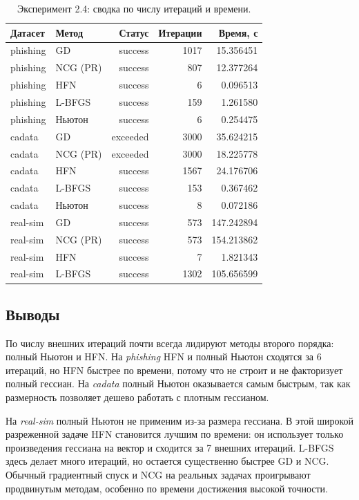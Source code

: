 \documentclass[a4paper,12pt]{article}
\begin{document}
\begin{table}[H]
\centering
\small
\begin{tabular}{@{}llrrr@{}}
\toprule
Датасет & Метод & Статус & Итерации & Время, с \\
\midrule
phishing & GD & success & 1017 & 15.356451 \\
phishing & NCG (PR) & success & 807 & 12.377264 \\
phishing & HFN & success & 6 & 0.096513 \\
phishing & L-BFGS & success & 159 & 1.261580 \\
phishing & Ньютон & success & 6 & 0.254475 \\
\midrule
cadata & GD & exceeded & 3000 & 35.624215 \\
cadata & NCG (PR) & exceeded & 3000 & 18.225778 \\
cadata & HFN & success & 1567 & 24.176706 \\
cadata & L-BFGS & success & 153 & 0.367462 \\
cadata & Ньютон & success & 8 & 0.072186 \\
\midrule
real-sim & GD & success & 573 & 147.242894 \\
real-sim & NCG (PR) & success & 573 & 154.213862 \\
real-sim & HFN & success & 7 & 1.821343 \\
real-sim & L-BFGS & success & 1302 & 105.656599 \\
\bottomrule
\end{tabular}
\caption{Эксперимент 2.4: сводка по числу итераций и времени.}
\end{table}

\subsection*{Выводы}
По числу внешних итераций почти всегда лидируют методы второго порядка: полный Ньютон и HFN. На \textit{phishing} HFN и полный Ньютон сходятся за 6 итераций, но HFN быстрее по времени, потому что не строит и не факторизует полный гессиан. На \textit{cadata} полный Ньютон оказывается самым быстрым, так как размерность позволяет дешево работать с плотным гессианом.

На \textit{real-sim} полный Ньютон не применим из-за размера гессиана. В этой широкой разреженной задаче HFN становится лучшим по времени: он использует только произведения гессиана на вектор и сходится за 7 внешних итераций. L-BFGS здесь делает много итераций, но остается существенно быстрее GD и NCG. Обычный градиентный спуск и NCG на реальных задачах проигрывают продвинутым методам, особенно по времени достижения высокой точности.
\end{document}
